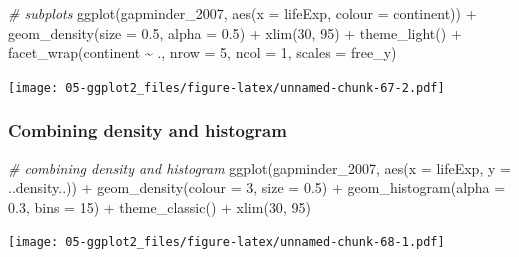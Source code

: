 \documentclass[
]{book}
\newenvironment{Shaded}{\begin{snugshade}}{\end{snugshade}}
\newcommand{\AttributeTok}[1]{\textcolor[rgb]{0.77,0.63,0.00}{#1}}
\newcommand{\CommentTok}[1]{\textcolor[rgb]{0.56,0.35,0.01}{\textit{#1}}}
\newcommand{\DecValTok}[1]{\textcolor[rgb]{0.00,0.00,0.81}{#1}}
\newcommand{\FloatTok}[1]{\textcolor[rgb]{0.00,0.00,0.81}{#1}}
\newcommand{\FunctionTok}[1]{\textcolor[rgb]{0.00,0.00,0.00}{#1}}
\newcommand{\NormalTok}[1]{#1}
\newcommand{\SpecialCharTok}[1]{\textcolor[rgb]{0.00,0.00,0.00}{#1}}
\newcommand{\StringTok}[1]{\textcolor[rgb]{0.31,0.60,0.02}{#1}}
\begin{document}
\begin{Shaded}
\begin{Highlighting}[]
\CommentTok{\# subplots}
\FunctionTok{ggplot}\NormalTok{(gapminder\_2007, }\FunctionTok{aes}\NormalTok{(}\AttributeTok{x =}\NormalTok{ lifeExp, }\AttributeTok{colour =}\NormalTok{ continent)) }\SpecialCharTok{+}
   \FunctionTok{geom\_density}\NormalTok{(}\AttributeTok{size =} \FloatTok{0.5}\NormalTok{, }\AttributeTok{alpha =} \FloatTok{0.5}\NormalTok{) }\SpecialCharTok{+}
   \FunctionTok{xlim}\NormalTok{(}\DecValTok{30}\NormalTok{, }\DecValTok{95}\NormalTok{) }\SpecialCharTok{+}
   \FunctionTok{theme\_light}\NormalTok{() }\SpecialCharTok{+}
   \FunctionTok{facet\_wrap}\NormalTok{(continent }\SpecialCharTok{\textasciitilde{}}\NormalTok{ ., }\AttributeTok{nrow =} \DecValTok{5}\NormalTok{, }\AttributeTok{ncol =} \DecValTok{1}\NormalTok{, }\AttributeTok{scales =} \StringTok{\textquotesingle{}free\_y\textquotesingle{}}\NormalTok{)}
\end{Highlighting}
\end{Shaded}

\texttt{[image: 05-ggplot2\_files/figure-latex/unnamed-chunk-67-2.pdf]}

\hypertarget{combining-density-and-histogram}{%
\subsubsection{Combining density and histogram}\label{combining-density-and-histogram}}

\begin{Shaded}
\begin{Highlighting}[]
\CommentTok{\# combining density and histogram}
\FunctionTok{ggplot}\NormalTok{(gapminder\_2007, }\FunctionTok{aes}\NormalTok{(}\AttributeTok{x =}\NormalTok{ lifeExp, }\AttributeTok{y =}\NormalTok{ ..density..)) }\SpecialCharTok{+} 
   \FunctionTok{geom\_density}\NormalTok{(}\AttributeTok{colour =} \DecValTok{3}\NormalTok{, }\AttributeTok{size =} \FloatTok{0.5}\NormalTok{) }\SpecialCharTok{+}
   \FunctionTok{geom\_histogram}\NormalTok{(}\AttributeTok{alpha =} \FloatTok{0.3}\NormalTok{, }\AttributeTok{bins =} \DecValTok{15}\NormalTok{) }\SpecialCharTok{+}
   \FunctionTok{theme\_classic}\NormalTok{() }\SpecialCharTok{+}
   \FunctionTok{xlim}\NormalTok{(}\DecValTok{30}\NormalTok{, }\DecValTok{95}\NormalTok{)}
\end{Highlighting}
\end{Shaded}

\texttt{[image: 05-ggplot2\_files/figure-latex/unnamed-chunk-68-1.pdf]}
\end{document}
